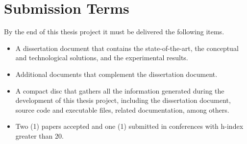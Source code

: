 \section{Submission Terms}
\label{sec:submission_terms}

By the end of this thesis project it must be delivered the following items.

\begin{itemize}
    \item A dissertation document that contains the state-of-the-art, the conceptual and technological solutions, and the experimental results.
    \item Additional documents that complement the dissertation document.
    \item A compact disc that gathers all the information generated during the development of this thesis project, including the dissertation document, source code and executable files, related documentation, among others.
    \item Two (1) papers accepted and one (1) submitted in conferences with h-index greater than 20.
\end{itemize}